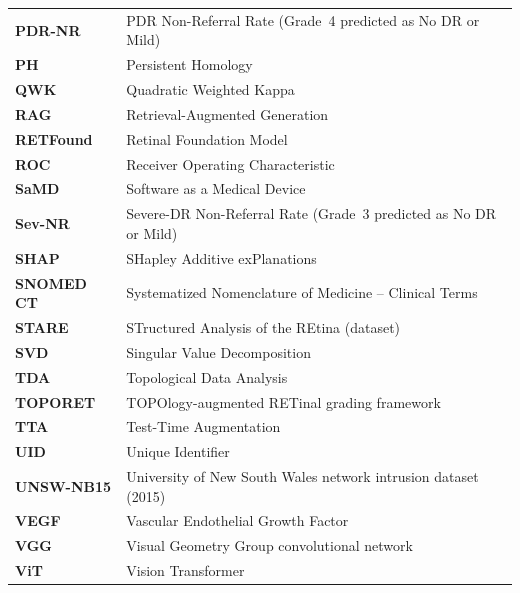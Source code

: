 \begin{longtable}{@{}>{\bfseries}l P{12.1cm}@{}}
PDR-NR & PDR Non-Referral Rate (Grade~4 predicted as No DR or Mild) \\
PH & Persistent Homology \\
QWK & Quadratic Weighted Kappa \\
RAG & Retrieval-Augmented Generation \\
RETFound & Retinal Foundation Model \\
ROC & Receiver Operating Characteristic \\
SaMD & Software as a Medical Device \\
Sev-NR & Severe-DR Non-Referral Rate (Grade~3 predicted as No DR or Mild) \\
SHAP & SHapley Additive exPlanations \\
SNOMED CT & Systematized Nomenclature of Medicine -- Clinical Terms \\
STARE & STructured Analysis of the REtina (dataset) \\
SVD & Singular Value Decomposition \\
TDA & Topological Data Analysis \\
TOPORET & TOPOlogy-augmented RETinal grading framework \\
TTA & Test-Time Augmentation \\
UID & Unique Identifier \\
UNSW-NB15 & University of New South Wales network intrusion dataset (2015) \\
VEGF & Vascular Endothelial Growth Factor \\
VGG & Visual Geometry Group convolutional network \\
ViT & Vision Transformer \\
\end{longtable}
\addtocounter{table}{-1}
\endgroup
